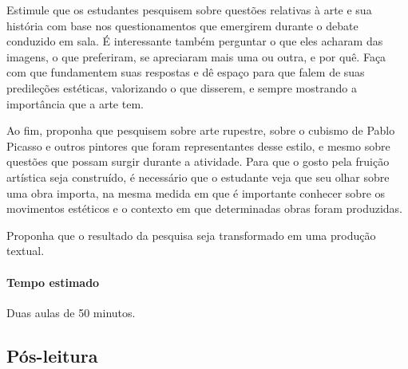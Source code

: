 \documentclass{extarticle}
\begin{document}
  Estimule que os estudantes pesquisem sobre questões relativas à arte e
  sua história com base nos questionamentos que emergirem durante o
  debate conduzido em sala. É interessante também perguntar o que eles
  acharam das imagens, o que preferiram, se apreciaram mais uma ou
  outra, e por quê. Faça com que fundamentem suas respostas e dê espaço
  para que falem de suas predileções estéticas, valorizando o que
  disserem, e sempre mostrando a importância que a arte tem.

  Ao fim, proponha que pesquisem sobre arte rupestre, sobre o cubismo de
  Pablo Picasso e outros pintores que foram representantes desse estilo,
  e mesmo sobre questões que possam surgir durante a atividade. Para que
  o gosto pela fruição artística seja construído, é necessário que o
  estudante veja que seu olhar sobre uma obra importa, na mesma medida
  em que é importante conhecer sobre os movimentos estéticos e o
  contexto em que determinadas obras foram produzidas.

  Proponha que o resultado da pesquisa seja transformado em uma produção
  textual.

\paragraph{Tempo estimado} Duas aulas de 50 minutos.

\subsection{Pós-leitura}
\end{document}
